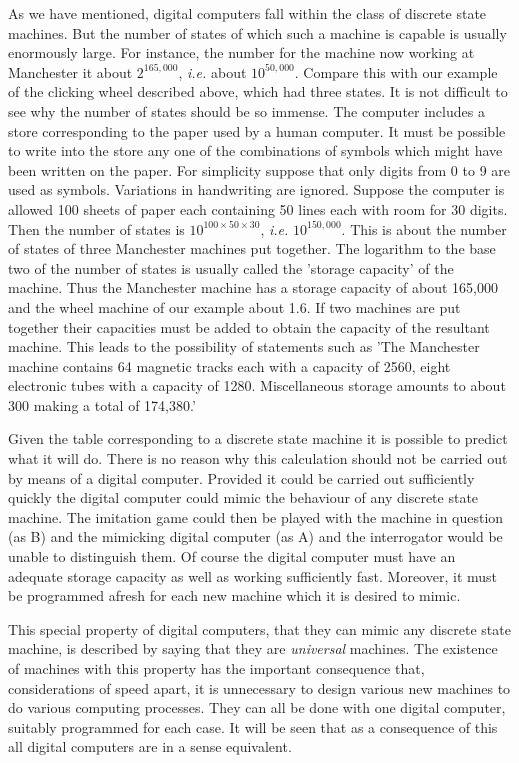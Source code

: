 \documentclass[12pt]{article}
\begin{document}
    As we have mentioned, digital computers fall within the class of discrete state machines. But the number of states of which such a machine is capable is usually enormously large. For instance, the number for the machine now working at Manchester it about $2^{165,000}$, \textit{i.e.} about $10^{50,000}$. Compare this with our example of the clicking wheel described above, which had three states. It is not difficult to see why the number of states should be so immense. The computer includes a store corresponding to the paper used by a human computer. It must be possible to write into the store any one of the combinations of symbols which might have been written on the paper. For simplicity suppose that only digits from 0 to 9 are used as symbols. Variations in handwriting are ignored. Suppose the computer is allowed 100 sheets of paper each containing 50 lines each with room for 30 digits. Then the number of states is $10^{100\times50\times30}$, \textit{i.e.} $10^{150,000}$. This is about the number of states of three Manchester machines put together. The logarithm to the base two of the number of states is usually called the 'storage capacity' of the machine. Thus the Manchester machine has a storage capacity of about 165,000 and the wheel machine of our example about 1.6. If two machines are put together their capacities must be added to obtain the capacity of the resultant machine. This leads to the possibility of statements such as 'The Manchester machine contains 64 magnetic tracks each with a capacity of 2560, eight electronic tubes with a capacity of 1280. Miscellaneous storage amounts to about 300 making a total of 174,380.'

    Given the table corresponding to a discrete state machine it is possible to predict what it will do. There is no reason why this calculation should not be carried out by means of a digital computer. Provided it could be carried out sufficiently quickly the digital computer could mimic the behaviour of any discrete state machine. The imitation game could then be played with the machine in question (as B) and the mimicking digital computer (as A) and the interrogator would be unable to distinguish them. Of course the digital computer must have an adequate storage capacity as well as working sufficiently fast. Moreover, it must be programmed afresh for each new machine which it is desired to mimic.

    This special property of digital computers, that they can mimic any discrete state machine, is described by saying that they are \textit{universal} machines. The existence of machines with this property has the important consequence that, considerations of speed apart, it is unnecessary to design various new machines to do various computing processes. They can all be done with one digital computer, suitably programmed for each case. It will be seen that as a consequence of this all digital computers are in a sense equivalent.
\end{document}
